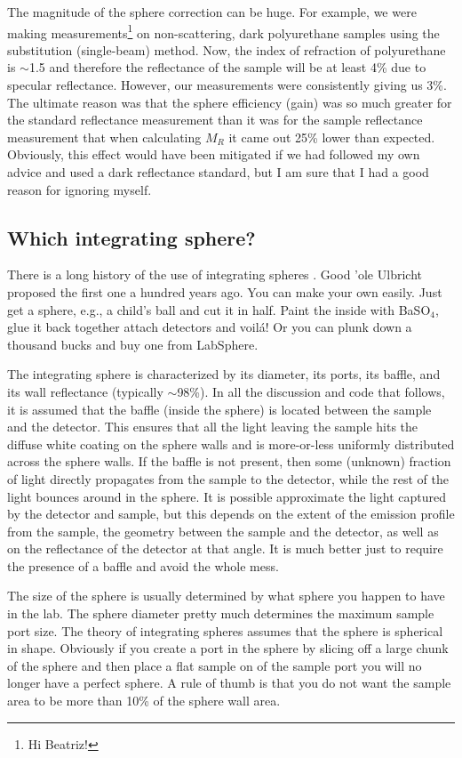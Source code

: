 \documentclass{article}
\begin{document}
The magnitude of the sphere correction can be huge.  For example, we were making
measurements\footnote{Hi Beatriz!} on non-scattering, dark polyurethane samples
using the substitution (single-beam) method.
Now, the index of refraction of polyurethane is $\sim$1.5 and therefore the 
reflectance of the sample will be at least 4\% due to specular reflectance.
However, our measurements were consistently giving us 3\%.  The ultimate reason
was that the sphere efficiency (gain) was so much greater for the standard reflectance
measurement than it was for the sample reflectance measurement that when
calculating $M_R$ it came out 25\% lower than expected.  Obviously, this effect
would have been mitigated if we had followed my own advice and used a dark
reflectance standard, but I am sure that I had a good reason for ignoring myself.

\subsection{Which integrating sphere?}
There is a long history of the use of integrating spheres%
\cite{sumpner92,ulbricht00,taylor20,jacquez55,goebel67,pickering92}.  Good 'ole  Ulbricht
proposed the first one a hundred years ago\cite{ulbricht00}.  You can make your own easily.  Just
get a sphere, e.g., a child's ball and cut it in half.  Paint the inside with
BaSO$_4$, glue it back together attach detectors and voil\'{a}!  Or you can plunk
down a thousand bucks and buy one from LabSphere.  

The integrating sphere is characterized by its diameter, its ports, its baffle,
and its wall reflectance (typically $\sim$98\%).  In all the discussion and
code that follows, it is assumed that the baffle (inside the sphere) is located
between the sample and the detector.  This ensures that all the light leaving 
the sample hits the diffuse white coating on the sphere walls and is more-or-less
uniformly distributed across the sphere walls.  If the baffle is not present, then
some (unknown) fraction of light directly propagates from the sample to the
detector, while the rest of the light bounces around in the sphere.  It is
possible approximate the light captured by the detector and sample, but this
depends on the extent of the emission profile from the sample, the geometry
between the sample and the detector, as well as on the reflectance of the
detector at that angle.  It is much better just to require the presence of a
baffle and avoid the whole mess.  

The size of the sphere is usually determined by what sphere you happen to
have in the lab.  The sphere diameter pretty much determines the maximum
sample port size.  The theory of integrating spheres assumes that the sphere
is spherical in shape.  Obviously if you create a port in the sphere by 
slicing off a large chunk of the sphere and then place a flat sample 
on of the sample port you will no longer have a perfect sphere.  A rule of
thumb is that you do not want the sample area to be more than 10\% of the
sphere wall area.  
\end{document}
